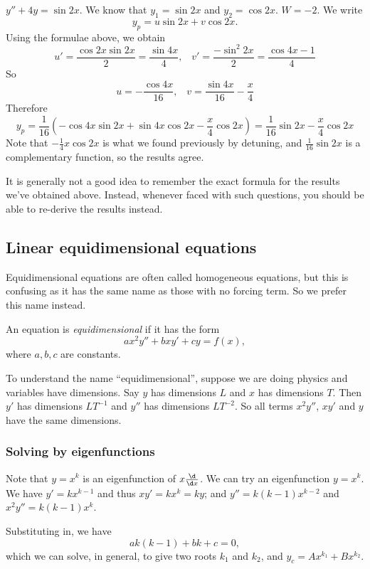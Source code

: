 \documentclass[a4paper]{article}
\begin{document}
\begin{eg}
  $y'' + 4y = \sin 2x$. We know that $y_1 = \sin 2x$ and $y_2 = \cos 2x$. $W = -2$. We write
  \[
    y_p = u\sin 2x + v\cos 2x.
  \]
  Using the formulae above, we obtain
  \[
    u' = \frac{\cos 2x\sin 2x}{2} = \frac{\sin 4x}{4},\;\;\; v' = \frac{-\sin^2 2x}{2} = \frac{\cos 4x - 1}{4}
  \]
  So
  \[
    u = -\frac{\cos 4x}{16}, \;\;\; v = \frac{\sin 4x}{16} - \frac{x}{4}
  \]
  Therefore
  \[
    y_p = \frac{1}{16}(-\cos 4x\sin 2x + \sin 4x\cos 2x - \frac{x}{4}\cos 2x) = \frac{1}{16}\sin 2x - \frac{x}{4}\cos 2x
  \]
  Note that $-\frac{1}{4}x\cos 2x$ is what we found previously by detuning, and $\frac{1}{16}\sin 2x$ is a complementary function, so the results agree.
\end{eg}

It is generally not a good idea to remember the exact formula for the results we've obtained above. Instead, whenever faced with such questions, you should be able to re-derive the results instead.

\subsection{Linear equidimensional equations}
Equidimensional equations are often called homogeneous equations, but this is confusing as it has the same name as those with no forcing term. So we prefer this name instead.

\begin{defi}
  An equation is \emph{equidimensional} if it has the form
  \[
    ax^2y'' + bxy' + cy = f(x),
  \]
  where $a, b, c$ are constants.
\end{defi}
To understand the name ``equidimensional'', suppose we are doing physics and variables have dimensions. Say $y$ has dimensions $L$ and $x$ has dimensions $T$. Then $y'$ has dimensions $LT^{-1}$ and $y''$ has dimensions $LT^{-2}$. So all terms $x^2 y''$, $xy'$ and $y$ have the same dimensions.

\subsubsection*{Solving by eigenfunctions}
Note that $y = x^k$ is an eigenfunction of $x\frac{\d}{\d x}$. We can try an eigenfunction $y = x^k$. We have $y' = kx^{k - 1}$ and thus $xy' = kx^k = ky$; and $y'' = k(k - 1)x^{k - 2}$ and $x^2y'' = k(k - 1)x^k$.

Substituting in, we have
\[
  ak(k - 1) + bk + c = 0,
\]
which we can solve, in general, to give two roots $k_1$ and $k_2$, and $y_c = Ax^{k_1} + Bx^{k_2}$.
\end{document}
